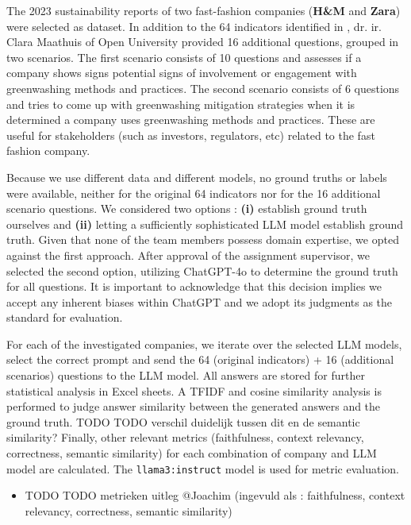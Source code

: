 \documentclass[]{article}
\begin{document}
The 2023 sustainability reports of two fast-fashion companies (\textbf{H\&M} and \textbf{Zara}) were selected as dataset.
In addition to the 64 indicators identified in \cite{durability}, dr. ir. Clara Maathuis of Open University \cite{ou} provided 16 additional questions, grouped in two scenarios.
The first scenario consists of 10 questions and assesses if a company shows signs potential signs of involvement or engagement with greenwashing methods and practices.
The second scenario consists of 6 questions and tries to come up with greenwashing mitigation strategies when it is determined a company uses greenwashing methods and practices.
These are useful for stakeholders (such as investors, regulators, etc) related to the fast fashion company.

Because we use different data and different models, no ground truths or labels were available, neither for the original 64 indicators nor for the 16 additional scenario questions.
We considered two options : \textbf{(i)} establish ground truth ourselves and \textbf{(ii)} letting a sufficiently sophisticated LLM model establish ground truth.
Given that none of the team members possess domain expertise, we opted against the first approach.
After approval of the assignment supervisor, we selected the second option, utilizing ChatGPT-4o to determine the ground truth for all questions.
It is important to acknowledge that this decision implies we accept any inherent biases within ChatGPT and we adopt its judgments as the standard for evaluation.

For each of the investigated companies, we iterate over the selected LLM models, select the correct prompt and send the 64 (original indicators) + 16 (additional scenarios) questions to the LLM model.
All answers are stored for further statistical analysis in Excel sheets.
A TFIDF and cosine similarity analysis is performed to judge answer similarity between the generated answers and the ground truth.  TODO TODO verschil duidelijk tussen dit en de semantic similarity?
Finally, other relevant metrics (faithfulness, context relevancy, correctness, semantic similarity) for each combination of company and LLM model are calculated.
The \texttt{llama3:instruct} model is used for metric evaluation.

\begin{itemize}
    \item TODO TODO metrieken uitleg @Joachim (ingevuld als : faithfulness, context relevancy, correctness, semantic similarity)
\end{itemize}
\end{document}
